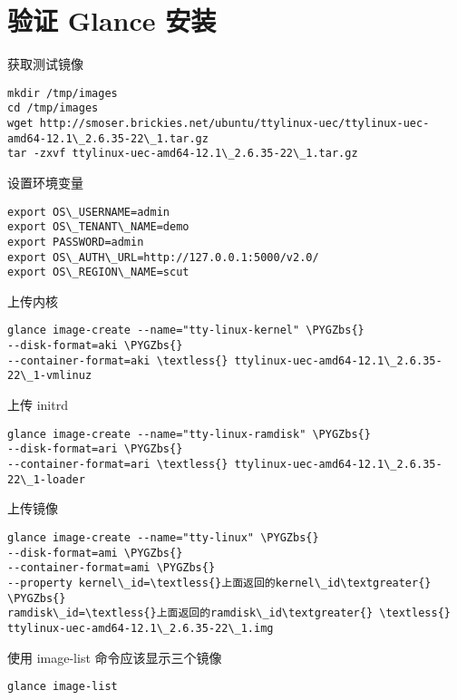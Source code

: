 \documentclass[a4paper,12pt,english]{sphinxmanual}
\def\PYGZbs{\char`\\}
\begin{document}
\section{验证 Glance 安装}
\label{glance:id5}
获取测试镜像

\begin{Verbatim}[commandchars=\\\{\}]
mkdir /tmp/images
cd /tmp/images
wget http://smoser.brickies.net/ubuntu/ttylinux-uec/ttylinux-uec-amd64-12.1\_2.6.35-22\_1.tar.gz
tar -zxvf ttylinux-uec-amd64-12.1\_2.6.35-22\_1.tar.gz
\end{Verbatim}

设置环境变量

\begin{Verbatim}[commandchars=\\\{\}]
export OS\_USERNAME=admin
export OS\_TENANT\_NAME=demo
export PASSWORD=admin
export OS\_AUTH\_URL=http://127.0.0.1:5000/v2.0/
export OS\_REGION\_NAME=scut
\end{Verbatim}

上传内核

\begin{Verbatim}[commandchars=\\\{\}]
glance image-create --name="tty-linux-kernel" \PYGZbs{}
--disk-format=aki \PYGZbs{}
--container-format=aki \textless{} ttylinux-uec-amd64-12.1\_2.6.35-22\_1-vmlinuz
\end{Verbatim}

上传 initrd

\begin{Verbatim}[commandchars=\\\{\}]
glance image-create --name="tty-linux-ramdisk" \PYGZbs{}
--disk-format=ari \PYGZbs{}
--container-format=ari \textless{} ttylinux-uec-amd64-12.1\_2.6.35-22\_1-loader
\end{Verbatim}

上传镜像

\begin{Verbatim}[commandchars=\\\{\}]
glance image-create --name="tty-linux" \PYGZbs{}
--disk-format=ami \PYGZbs{}
--container-format=ami \PYGZbs{}
--property kernel\_id=\textless{}上面返回的kernel\_id\textgreater{} \PYGZbs{}
ramdisk\_id=\textless{}上面返回的ramdisk\_id\textgreater{} \textless{} ttylinux-uec-amd64-12.1\_2.6.35-22\_1.img
\end{Verbatim}

使用 image-list 命令应该显示三个镜像

\begin{Verbatim}[commandchars=\\\{\}]
glance image-list
\end{Verbatim}
\end{document}
